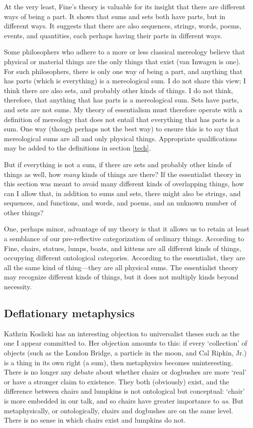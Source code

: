 \documentclass[11pt]{article}
\begin{document}
\begin{spacing}{1.5}
At the very least, Fine's theory is valuable for its insight that
there are different ways of being a part.  It shows that sums and sets
both have parts, but in different ways.  It suggests that there are
also sequences, strings, words, poems, events, and quantities, each
perhaps having their parts in different ways.

Some philosophers who adhere to a more or less classical mereology
believe that physical or material things are the only things that
exist (van Inwagen is one).  For such philosophers, there is only one
way of being a part, and anything that has parts (which is everything)
is a mereological sum.  I do not share this view; I think there are
also sets, and probably other kinds of things.  I do not think,
therefore, that anything that has parts is a mereological sum.  Sets
have parts, and sets are not sums.  My theory of essentialism must
therefore operate with a definition of mereology that does not entail
that everything that has parts is a sum.  One way (though perhaps not
the best way) to ensure this is to say that mereological sums are all
and only physical things.  Appropriate qualifications may be added to
the definitions in section \ref{tech}.

But if everything is not a sum, if there are sets and probably other
kinds of things as well, how {\em many} kinds of things are there?  If
the essentialist theory in this section was meant to avoid many
different kinds of overlapping things, how can I allow that, in
addition to sums and sets, there might also be strings, and sequences,
and functions, and words, and poems, and an unknown number of other
things?

One, perhaps minor, advantage of my theory is that it allows us to
retain at least a semblance of our pre-reflective categorization of
ordinary things.  According to Fine, chairs, statues, lumps, boats,
and kittens are all different kinds of things, occupying different
ontological categories.  According to the essentialist, they are all
the same kind of thing---they are all physical sums.  The essentialist
theory may recognize different kinds of things, but it does not
multiply kinds beyond necessity.

\subsection{Deflationary metaphysics}
\label{deflate}
Kathrin Koslicki has an interesting objection to universalist theses
such as the one I appear committed to.  Her objection amounts to this:
if every `collection' of objects (such as the London Bridge, a
particle in the moon, and Cal Ripkin, Jr.) is a thing in its own right
(a sum), then metaphysics becomes uninteresting.  There is no longer
any debate about whether chairs or dogbushes are more `real' or have a
stronger claim to existence.  They both (obviously) exist, and the
difference between chairs and lumpkins is not ontological but
conceptual: `chair' is more embedded in our talk, and so chairs have
greater importance to {\em us}.  But metaphysically, or ontologically,
chairs and dogbushes are on the same level.  There is no sense in
which chairs exist and lumpkins do not.


\end{spacing}
\end{document}
